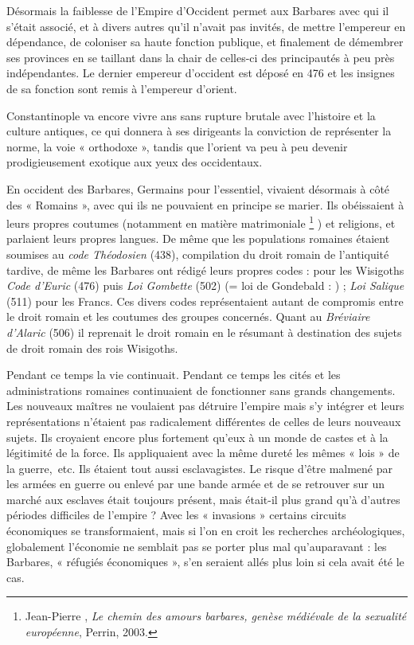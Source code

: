  Désormais la faiblesse de l'Empire d'Occident permet aux Barbares avec qui il s'était associé, et à divers autres qu'il n'avait pas invités, de mettre l'empereur en dépendance, de coloniser sa haute fonction publique, et finalement de démembrer ses provinces en se taillant dans la chair de celles-ci des principautés à peu près indépendantes. Le dernier empereur d'occident est déposé en 476 et les insignes de sa fonction sont remis à l'empereur d'orient. 

 Constantinople va encore vivre  ans sans rupture brutale avec l'histoire et la culture antiques, ce qui donnera à ses dirigeants la conviction de représenter la norme, la voie « orthodoxe », tandis que l'orient va peu à peu devenir prodigieusement exotique aux yeux des occidentaux.

 En occident des Barbares, Germains pour l'essentiel, vivaient désormais à côté des « Romains », avec qui ils ne pouvaient en principe se marier. Ils obéissaient à leurs propres coutumes (notamment en matière matrimoniale%
\footnote{Jean-Pierre , \emph{Le chemin des amours barbares, genèse médiévale de la sexualité européenne}, Perrin, 2003.}%
) et religions, et parlaient leurs propres langues. De même que les populations romaines étaient soumises au \emph{code Théodosien} (438), compilation du droit romain de l'antiquité tardive, de même les Barbares ont rédigé leurs propres codes : pour les Wisigoths \emph{Code d'Euric} (476) puis \emph{Loi Gombette} (502) (= loi de Gondebald : ) ; \emph{Loi Salique} (511) pour les Francs. Ces divers codes représentaient autant de compromis entre le droit romain et les coutumes des groupes concernés. Quant au \emph{Bréviaire d'Alaric} (506) il reprenait le droit romain en le résumant à destination des sujets de droit romain des rois Wisigoths.

 Pendant ce temps la vie continuait. Pendant ce temps les cités et les administrations romaines continuaient de fonctionner sans grands changements. Les nouveaux maîtres ne voulaient pas détruire l'empire mais s'y intégrer et leurs représentations n'étaient pas radicalement différentes de celles de leurs nouveaux sujets. Ils croyaient encore plus fortement qu'eux à un monde de castes et à la légitimité de la force. Ils appliquaient avec la même dureté les mêmes « lois » de la guerre,~etc. Ils étaient tout aussi esclavagistes. Le risque d'être malmené par les armées en guerre ou enlevé par une bande armée et de se retrouver sur un marché aux esclaves était toujours présent, mais était-il plus grand qu'à d'autres périodes difficiles de l'empire ? Avec les « invasions » certains circuits économiques se transformaient, mais si l'on en croit les recherches archéologiques, globalement l'économie ne semblait pas se porter plus mal qu'auparavant : les Barbares, « réfugiés économiques », s'en seraient allés plus loin si cela avait été le cas.

